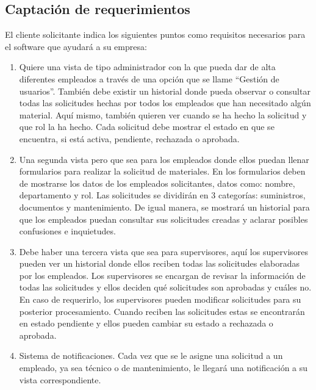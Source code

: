 \documentclass{article}
\begin{document}
\vspace{1cm}

\subsection*{Captación de requerimientos}

El cliente solicitante indica los siguientes puntos como requisitos necesarios para el software que ayudará a su empresa:

\begin{enumerate}
    \item Quiere una vista de tipo administrador con la que pueda dar de alta diferentes empleados a través de una opción que se llame “Gestión de usuarios”. También debe existir un historial donde pueda observar o consultar todas las solicitudes hechas por todos los empleados que han necesitado algún material. Aquí mismo, también quieren ver cuando se ha hecho la solicitud y que rol la ha hecho. Cada solicitud debe mostrar el estado en que se encuentra, si está activa, pendiente, rechazada o aprobada.
    \item Una segunda vista pero que sea para los empleados donde ellos puedan llenar formularios para realizar la solicitud de materiales. En los formularios deben de mostrarse los datos de los empleados solicitantes, datos como: nombre, departamento y rol. Las solicitudes se dividirán en 3 categorías: suministros, documentos y mantenimiento. De igual manera, se mostrará un historial para que los empleados puedan consultar sus solicitudes creadas y aclarar posibles confusiones e inquietudes.
    \item Debe haber una tercera vista que sea para supervisores, aquí los supervisores pueden ver un historial donde ellos reciben todas las solicitudes elaboradas por los empleados. Los supervisores se encargan de revisar la información de todas las solicitudes y ellos deciden qué solicitudes son aprobadas y cuáles no. En caso de requerirlo, los supervisores pueden modificar solicitudes para su posterior procesamiento. Cuando reciben las solicitudes estas se encontrarán en estado pendiente y ellos pueden cambiar su estado a rechazada o aprobada.
    \item Sistema de notificaciones. Cada vez que se le asigne una solicitud a un empleado, ya sea técnico o de mantenimiento, le llegará una notificación a su vista correspondiente.
\end{enumerate}

\vspace{1cm}
\end{document}
